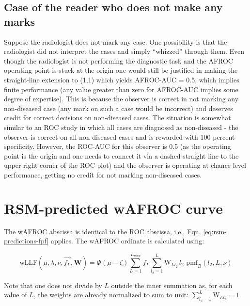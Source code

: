 \documentclass[
]{book}
\begin{document}
\hypertarget{rsm-other-predictions-no-marks}{%
\subsection{Case of the reader who does not make any marks}\label{rsm-other-predictions-no-marks}}

Suppose the radiologist does not mark any case. One possibility is that the radiologist did not interpret the cases and simply ``whizzed'' through them. Even though the radiologist is not performing the diagnostic task and the AFROC operating point is stuck at the origin one would still be justified in making the straight-line extension to (1,1) which yields AFROC-AUC = 0.5, which implies finite performance (any value greater than zero for AFROC-AUC implies some degree of expertise). This is because the observer is correct in not marking any non-diseased case (any mark on such a case would be incorrect) and deserves credit for correct decisions on non-diseased cases. The situation is somewhat similar to an ROC study in which all cases are diagnosed as non-diseased - the observer is correct on all non-diseased cases and is rewarded with 100 percent specificity. However, the ROC-AUC for this observer is 0.5 (as the operating point is the origin and one needs to connect it via a dashed straight line to the upper right corner of the ROC plot) and the observer is operating at chance level performance, getting no credit for not marking non-diseased cases.

\hypertarget{rsm-other-predictions-wafroc-curve}{%
\section{RSM-predicted wAFROC curve}\label{rsm-other-predictions-wafroc-curve}}

The wAFROC abscissa is identical to the ROC abscissa, i.e., Eqn. \eqref{eq:rsm-predictions-fpf} applies. The wAFROC ordinate is calculated using:

\begin{equation} 
\text{wLLF} \left ( \mu, \lambda, \nu, \overrightarrow{f_L}, \mathbf{W} \right ) = \Phi\left ( \mu - \zeta \right )\sum_{L=1}^{L_{max}} f_L \sum_{l_2=1}^{L} \text{W}_{Ll_2} \, l_2 \,\,  \text{pmf}_{B}\left ( l_2, L, \nu \right )
\label{eq:rsm-other-predictions-wllf}
\end{equation}

Note that one does not divide by \(L\) outside the inner summation as, for each value of \(L\), the weights are already normalized to sum to unit: \(\sum_{l_2=1}^{L} \text{W}_{Ll_2}=1\).
\end{document}
